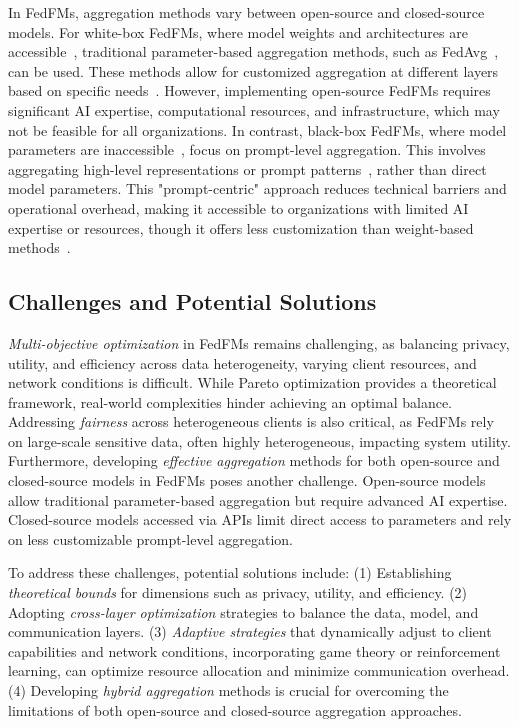 In FedFMs, aggregation methods vary between open-source and closed-source models. For white-box FedFMs, where model weights and architectures are accessible~\cite{zhang2023towards, wang2024flora}, traditional parameter-based aggregation methods, such as FedAvg~\cite{mcmahan2017communication}, can be used. These methods allow for customized aggregation at different layers based on specific needs~\cite{zhang2023towards, li2020federated}. However, implementing open-source FedFMs requires significant AI expertise, computational resources, and infrastructure, which may not be feasible for all organizations. In contrast, black-box FedFMs, where model parameters are inaccessible~\cite{guo2023pfedprompt, yang2023efficient, bai2024diprompt}, focus on prompt-level aggregation. This involves aggregating high-level representations or prompt patterns~\cite{guo2023pfedprompt, yang2023efficient, bai2024diprompt}, rather than direct model parameters. This "prompt-centric" approach reduces technical barriers and operational overhead, making it accessible to organizations with limited AI expertise or resources, though it offers less customization than weight-based methods~\cite{yi2023pfedes}.


\subsection{Challenges and Potential Solutions}


\textit{Multi-objective optimization} in FedFMs remains challenging, as balancing privacy, utility, and efficiency across data heterogeneity, varying client resources, and network conditions is difficult. While Pareto optimization provides a theoretical framework, real-world complexities hinder achieving an optimal balance. Addressing \textit{fairness} across heterogeneous clients is also critical, as FedFMs rely on large-scale sensitive data, often highly heterogeneous, impacting system utility.
Furthermore, developing \textit{effective aggregation} methods for both open-source and closed-source models in FedFMs poses another challenge. Open-source models allow traditional parameter-based aggregation but require advanced AI expertise. Closed-source models accessed via APIs limit direct access to parameters and rely on less customizable prompt-level aggregation.

To address these challenges, potential solutions include: (1) Establishing \textit{theoretical bounds} for dimensions such as privacy, utility, and efficiency. (2) Adopting \textit{cross-layer optimization} strategies to balance the data, model, and communication layers. (3) \textit{Adaptive strategies} that dynamically adjust to client capabilities and network conditions, incorporating game theory or reinforcement learning, can optimize resource allocation and minimize communication overhead. (4) Developing \textit{hybrid aggregation} methods is crucial for overcoming the limitations of both open-source and closed-source aggregation approaches.